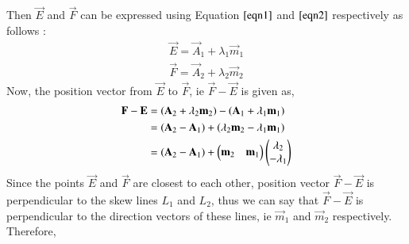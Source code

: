 \documentclass[journal,12pt,twocolumn]{IEEEtran}
\begin{document}
Then $\vec{E}$ and $\vec{F}$ can be expressed using Equation $\ref{eqn1}$ and $\ref{eqn2}$ respectively as follows :
\begin{align}
    \vec{E} = \vec{A}_1+\lambda_1\vec{m}_1%
\end{align}
\begin{align}
    \vec{F} = \vec{A}_2 + \lambda_2\vec{m}_2%
\end{align}
Now, the position vector from $\vec{E}$ to $\vec{F}$, ie $\vec{F}-\vec{E}$ is given as,
\begin{align}
    \mathbf{F}-\mathbf{E} & = (\mathbf{A}_2 + \lambda_2\mathbf{m}_2) - (\mathbf{A}_1 + \lambda_1\mathbf{m}_1)\\& = (\mathbf{A}_2 - \mathbf{A}_1) + (\lambda_2\mathbf{m}_2 - \lambda_1\mathbf{m}_1)\\& = \label{e4} (\mathbf{A}_2 - \mathbf{A}_1) + \begin{pmatrix}\mathbf{m}_2 & \mathbf{m}_1\end{pmatrix}\begin{pmatrix}\lambda_2 \\ -\lambda_1\end{pmatrix}
\end{align}
Since the points $\vec{E}$ and $\vec{F}$ are closest to each other, position vector $\vec{F}-\vec{E}$ is perpendicular to the skew lines $L_1$ and $L_2$, thus we can say that $\vec{F}-\vec{E}$ is perpendicular to the direction vectors of these lines, ie $\vec{m}_1$ and $\vec{m}_2$ respectively. Therefore,
\end{document}
